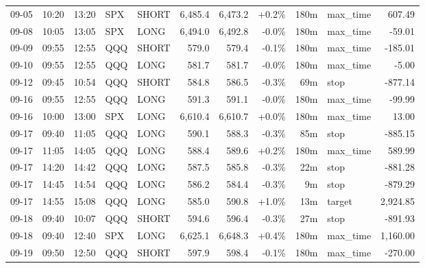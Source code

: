 \documentclass[11pt,a4paper,twoside]{article}
\begin{document}
\begin{center}
\begin{longtable}{>{\color{txtmain}}l l l l l r r r r >{\color{txtmain}}l r}
09-05 & 10:20 & 13:20 & SPX & SHORT & 6,485.4 & 6,473.2 & \textcolor{wingreen}{+0.2\%} & 180m & max\_time & \textcolor{wingreen}{607.49} \\
09-08 & 10:05 & 13:05 & SPX & LONG & 6,494.0 & 6,492.8 & \textcolor{lossred}{-0.0\%} & 180m & max\_time & \textcolor{lossred}{-59.01} \\
09-09 & 09:55 & 12:55 & QQQ & SHORT & 579.0 & 579.4 & \textcolor{lossred}{-0.1\%} & 180m & max\_time & \textcolor{lossred}{-185.01} \\
09-10 & 09:55 & 12:55 & QQQ & LONG & 581.7 & 581.7 & \textcolor{lossred}{-0.0\%} & 180m & max\_time & \textcolor{lossred}{-5.00} \\
09-12 & 09:45 & 10:54 & QQQ & SHORT & 584.8 & 586.5 & \textcolor{lossred}{-0.3\%} & 69m & stop & \textcolor{lossred}{-877.14} \\
09-16 & 09:55 & 12:55 & QQQ & LONG & 591.3 & 591.1 & \textcolor{lossred}{-0.0\%} & 180m & max\_time & \textcolor{lossred}{-99.99} \\
09-16 & 10:00 & 13:00 & SPX & LONG & 6,610.4 & 6,610.7 & \textcolor{wingreen}{+0.0\%} & 180m & max\_time & \textcolor{wingreen}{13.00} \\
09-17 & 09:40 & 11:05 & QQQ & LONG & 590.1 & 588.3 & \textcolor{lossred}{-0.3\%} & 85m & stop & \textcolor{lossred}{-885.15} \\
09-17 & 11:05 & 14:05 & QQQ & LONG & 588.4 & 589.6 & \textcolor{wingreen}{+0.2\%} & 180m & max\_time & \textcolor{wingreen}{589.99} \\
09-17 & 14:20 & 14:42 & QQQ & LONG & 587.5 & 585.8 & \textcolor{lossred}{-0.3\%} & 22m & stop & \textcolor{lossred}{-881.28} \\
09-17 & 14:45 & 14:54 & QQQ & LONG & 586.2 & 584.4 & \textcolor{lossred}{-0.3\%} & 9m & stop & \textcolor{lossred}{-879.29} \\
09-17 & 14:55 & 15:08 & QQQ & LONG & 585.0 & 590.8 & \textcolor{wingreen}{+1.0\%} & 13m & target & \textcolor{wingreen}{2,924.85} \\
09-18 & 09:40 & 10:07 & QQQ & SHORT & 594.6 & 596.4 & \textcolor{lossred}{-0.3\%} & 27m & stop & \textcolor{lossred}{-891.93} \\
09-18 & 09:40 & 12:40 & SPX & LONG & 6,625.1 & 6,648.3 & \textcolor{wingreen}{+0.4\%} & 180m & max\_time & \textcolor{wingreen}{1,160.00} \\
09-19 & 09:50 & 12:50 & QQQ & SHORT & 597.9 & 598.4 & \textcolor{lossred}{-0.1\%} & 180m & max\_time & \textcolor{lossred}{-270.00} \\

\end{longtable}
\end{center}
\end{document}
